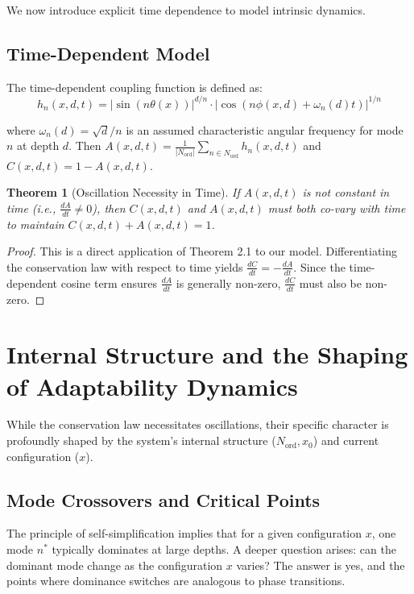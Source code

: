 \documentclass[11pt,a4paper]{article}
\newtheorem{theorem}{Theorem}[section]
\begin{document}
We now introduce explicit time dependence to model intrinsic dynamics.

\subsection{Time-Dependent Model}

The time-dependent coupling function is defined as:
\begin{equation}
    h_n(x,d,t) = |\sin(n\theta(x))|^{d/n} \cdot |\cos(n\phi(x,d) + \omega_n(d)t)|^{1/n}
\end{equation}

where $\omega_n(d) = \sqrt{d}/n$ is an assumed characteristic angular frequency for mode $n$ at depth $d$.
Then $A(x,d,t) = \frac{1}{|N_{\text{ord}}|} \sum_{n \in N_{\text{ord}}} h_n(x,d,t)$ and $C(x,d,t) = 1 - A(x,d,t)$.

\begin{theorem}[Oscillation Necessity in Time]
If $A(x,d,t)$ is not constant in time (i.e., $\frac{dA}{dt} \neq 0$), then $C(x,d,t)$ and $A(x,d,t)$ must both co-vary with time to maintain $C(x,d,t)+A(x,d,t)=1$.
\end{theorem}

\begin{proof}
This is a direct application of Theorem 2.1 to our model. Differentiating the conservation law with respect to time yields $\frac{dC}{dt} = -\frac{dA}{dt}$. Since the time-dependent cosine term ensures $\frac{dA}{dt}$ is generally non-zero, $\frac{dC}{dt}$ must also be non-zero.
\end{proof}

\section{Internal Structure and the Shaping of Adaptability Dynamics}

While the conservation law necessitates oscillations, their specific character is profoundly shaped by the system's internal structure ($N_{\text{ord}}, x_0$) and current configuration ($x$).


\subsection{Mode Crossovers and Critical Points}
The principle of self-simplification implies that for a given configuration $x$, one mode $n^*$ typically dominates at large depths. A deeper question arises: can the dominant mode change as the configuration $x$ varies? The answer is yes, and the points where dominance switches are analogous to phase transitions.
\end{document}
